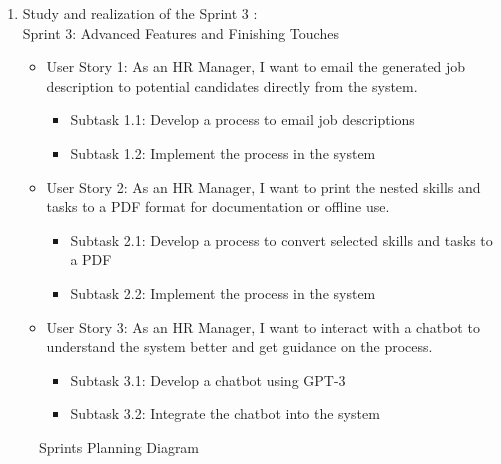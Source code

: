 \begin{enumerate}
    \item Study and realization of the Sprint 3 : \\
          Sprint 3: Advanced Features and Finishing Touches
          \begin{itemize}
              \renewcommand\labelitemi{-}
              \item User Story 1: As an HR Manager, I want to email the generated job description to potential candidates directly from the system.\\
                    \begin{itemize}
                        \item Subtask 1.1: Develop a process to email job descriptions
                        \item Subtask 1.2: Implement the process in the system
                    \end{itemize}
              \item User Story 2: As an HR Manager, I want to print the nested skills and tasks to a PDF format for documentation or offline use. \\
                    \begin{itemize}
                        \item Subtask 2.1: Develop a process to convert selected skills and tasks to a PDF
                        \item Subtask 2.2: Implement the process in the system
                    \end{itemize}
              \item User Story 3: As an HR Manager, I want to interact with a chatbot to understand the system better and get guidance on the process. \\
                    \begin{itemize}
                        \item Subtask 3.1: Develop a chatbot using GPT-3
                        \item Subtask 3.2: Integrate the chatbot into the system
                    \end{itemize}
          \end{itemize}
\end{enumerate}

\vspace{2cm}

\begin{figure}[H]
    \centering
    \caption{ Sprints Planning Diagram }
    \label{fig:Sprints_Graph}
\end{figure}


